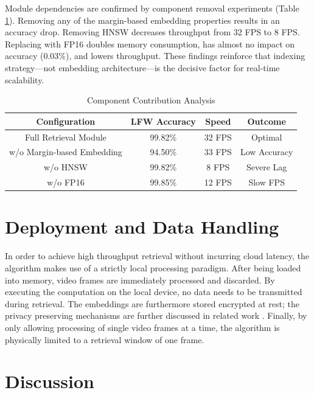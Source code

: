\documentclass[conference]{IEEEtran}
\begin{document}
Module dependencies are confirmed by component removal experiments (Table \ref{tab_ablation}). Removing any of the margin-based embedding properties results in an accuracy drop. Removing HNSW decreases throughput from 32 FPS to 8 FPS. Replacing with FP16 doubles memory consumption, has almost no impact on accuracy (0.03\%), and lowers throughput. These findings reinforce that indexing strategy—not embedding architecture—is the decisive factor for real-time scalability.

\begin{table}[htbp]
\caption{Component Contribution Analysis}
\begin{center}
\begin{tabular}{|c|c|c|c|}
\hline
Configuration & LFW Accuracy & Speed & Outcome \\
\hline
Full Retrieval Module & 99.82\% & 32 FPS & Optimal \\
\hline
w/o Margin-based Embedding & 94.50\% & 33 FPS & Low Accuracy \\
\hline
w/o HNSW & 99.82\% & 8 FPS & Severe Lag \\
\hline
w/o FP16 & 99.85\% & 12 FPS & Slow FPS \\
\hline
\end{tabular}
\label{tab_ablation}
\end{center}
\end{table}

\section{Deployment and Data Handling}
In order to achieve high throughput retrieval without incurring cloud latency, the algorithm makes use of a strictly local processing paradigm. After being loaded into memory, video frames are immediately processed and discarded. By executing the computation on the local device, no data needs to be transmitted during retrieval. The embeddings are furthermore stored encrypted at rest; the privacy preserving mechanisms are further discussed in related work \cite{p3}. Finally, by only allowing processing of single video frames at a time, the algorithm is physically limited to a retrieval window of one frame.

\section{Discussion}
\end{document}
